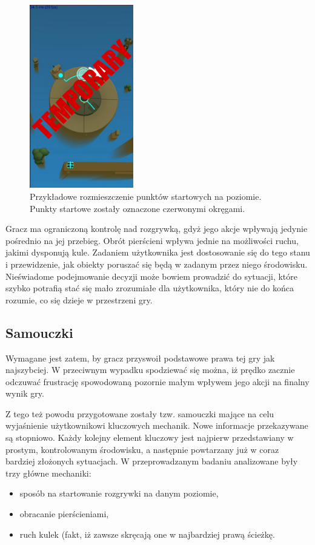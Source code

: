 \documentclass[a4paper,12pt,numbers=noenddot]{report}
\begin{document}
\begin{figure}[h!]
	\centering
  	\includegraphics[height=8cm]{fig/tmp.jpg}
	\caption{Przykładowe rozmieszczenie punktów startowych na poziomie. Punkty startowe zostały oznaczone czerwonymi okręgami.}
	\label{fig:sphaze_startpoints_1}
\end{figure}

Gracz ma ograniczoną kontrolę nad rozgrywką, gdyż jego akcje wpływają jedynie pośrednio na jej przebieg. Obrót pierścieni wpływa jednie na możliwości ruchu, jakimi dysponują kule. Zadaniem użytkownika jest dostosowanie się do tego stanu i przewidzenie, jak obiekty poruszać się będą w zadanym przez niego środowisku. Nieświadome podejmowanie decyzji może bowiem prowadzić do sytuacji, które szybko potrafią stać się mało zrozumiałe dla użytkownika, który nie do końca rozumie, co się dzieje w przestrzeni gry.

	\subsection{Samouczki}
Wymagane jest zatem, by gracz przyswoił podstawowe prawa tej gry jak najszybciej. W przeciwnym wypadku spodziewać się można, iż prędko zacznie odczuwać frustrację spowodowaną pozornie małym wpływem jego akcji na finalny wynik gry. 

Z tego też powodu przygotowane zostały tzw. samouczki mające na celu wyjaśnienie użytkownikowi kluczowych mechanik. Nowe informacje przekazywane są stopniowo. Każdy kolejny element kluczowy jest najpierw przedstawiany w prostym, kontrolowanym środowisku, a następnie powtarzany już w coraz bardziej złożonych sytuacjach. 
W przeprowadzanym badaniu analizowane były trzy główne mechaniki: 
\begin{itemize}
\item sposób na startowanie rozgrywki na danym poziomie, 
\item obracanie pierścieniami,
\item ruch kulek (fakt, iż zawsze skręcają one w najbardziej prawą ścieżkę.
\end{itemize}
\end{document}
